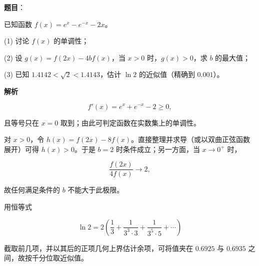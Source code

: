\begin{answer}

\textbf{题目}：

已知函数 $f(x)=e^x-e^{-x}-2x$。

(1) 讨论 $f(x)$ 的单调性；

(2) 设 $g(x)=f(2x)-4bf(x)$，当 $x>0$ 时，$g(x)>0$，求 $b$ 的最大值；

(3) 已知 $1.4142<\sqrt2<1.4143$，估计 $\ln2$ 的近似值（精确到 $0.001$）。

\textbf{解析}


\nopagebreak[4]
\[
f'(x)=e^x+e^{-x}-2\geqslant0,
\]

且等号只在 $x=0$ 取到；由此可判定函数在实数集上的单调性。


对 $x>0$，令 $h(x)=f(2x)-8f(x)$。直接整理并求导（或以双曲正弦函数展开）可得 $h(x)>0$。于是 $b=2$ 时条件成立；另一方面，当 $x\to0^+$ 时，

\nopagebreak[4]
\[
\frac{f(2x)}{4f(x)}\longrightarrow2,
\]

故任何满足条件的 $b$ 不能大于此极限。


用恒等式

\nopagebreak[4]
\[
\ln2=2\left(\frac13+\frac1{3^3\cdot3}+\frac1{3^5\cdot5}+\cdots\right)
\]

截取前几项，并以其后的正项几何上界估计余项，可将值夹在 $0.6925$ 与 $0.6935$ 之间，故按千分位取近似值。




\end{answer}
